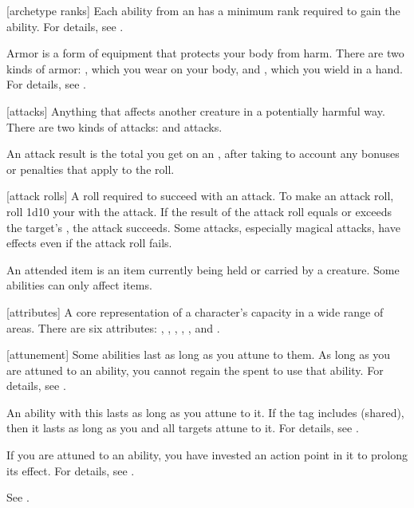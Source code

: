 [archetype ranks] Each ability from an  has a minimum rank required to gain the ability.
For details, see .

 Armor is a form of equipment that protects your body from harm.
There are two kinds of armor: , which you wear on your body, and , which you wield in a hand.
For details, see .

[attacks] Anything that affects another creature in a potentially harmful way. There are two kinds of attacks:  and  attacks.

 An attack result is the total you get on an , after taking to account any bonuses or penalties that apply to the roll.

[attack rolls] A roll required to succeed with an attack.
To make an attack roll, roll 1d10 \add your  with the attack.
If the result of the attack roll equals or exceeds the target's , the attack succeeds.
Some attacks, especially magical attacks, have effects even if the attack roll fails.

 An attended item is an item currently being held or carried by a creature.
Some abilities can only affect  items.

[attributes] A core representation of a character's capacity in a wide range of areas. There are six attributes: , , , , , and .

[attunement] Some abilities last as long as you attune to them.
As long as you are attuned to an ability, you cannot regain the  spent to use that ability.
For details, see .

 An ability with this  lasts as long as you attune to it.
If the tag includes (shared), then it lasts as long as you and all targets attune to it.
For details, see .

 If you are attuned to an ability, you have invested an action point in it to prolong its effect.
For details, see .

 See .

